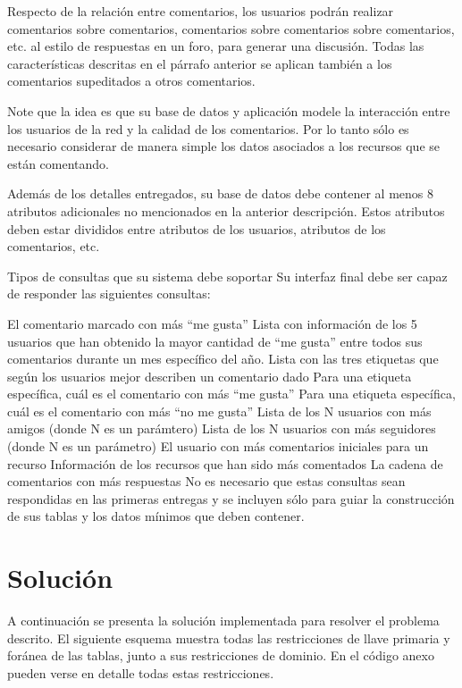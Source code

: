 \documentclass[12pt,letterpaper]{article}
\begin{document}
Respecto de la relación entre comentarios, los usuarios podrán realizar comentarios sobre comentarios, comentarios sobre comentarios sobre comentarios, etc. al estilo de respuestas en un foro, para generar una discusión. Todas las características descritas en el párrafo anterior se aplican también a los comentarios supeditados a otros comentarios.

Note que la idea es que su base de datos y aplicación modele la interacción entre los usuarios de la red y la calidad de los comentarios. Por lo tanto sólo es necesario considerar de manera simple los datos asociados a los recursos que se están comentando.

Además de los detalles entregados, su base de datos debe contener al menos 8 atributos adicionales no mencionados en la anterior descripción. Estos atributos deben estar divididos entre atributos de los usuarios, atributos de los comentarios, etc.


Tipos de consultas que su sistema debe soportar 
Su interfaz final debe ser capaz de responder las siguientes consultas:

El comentario marcado con más ``me gusta''
Lista con información de los 5 usuarios que han obtenido la mayor cantidad de ``me gusta'' entre todos sus comentarios durante un mes específico del año.
Lista con las tres etiquetas que según los usuarios mejor describen un comentario dado
Para una etiqueta específica, cuál es el comentario con más ``me gusta''
Para una etiqueta específica, cuál es el comentario con más ``no me gusta''
Lista de los N usuarios con más amigos (donde N es un parámtero)
Lista de los N usuarios con más seguidores (donde N es un parámetro)
El usuario con más comentarios iniciales para un recurso
Información de los recursos que han sido más comentados
La cadena de comentarios con más respuestas
No es necesario que estas consultas sean respondidas en las primeras entregas y se incluyen sólo para guiar la construcción de sus tablas y los datos mínimos que deben contener.

\section{Solución}

A continuación se presenta la solución implementada para resolver el problema descrito. El siguiente esquema muestra todas las restricciones de llave primaria y foránea de las tablas, junto a sus restricciones de dominio. En el código anexo pueden verse en detalle todas estas restricciones.
\end{document}

